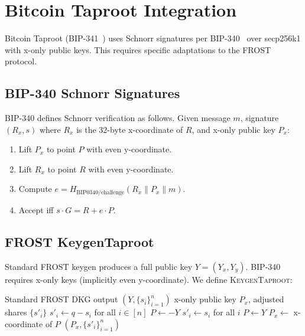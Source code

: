 \section{Bitcoin Taproot Integration}

\label{sec:taproot}

Bitcoin Taproot (BIP-341~\cite{bip341}) uses Schnorr signatures per BIP-340~\cite{bip340}
over secp256k1 with x-only public keys. This requires specific adaptations to the
FROST protocol.

\subsection{BIP-340 Schnorr Signatures}

BIP-340 defines Schnorr verification as follows. Given message $m$, signature
$(R_x, s)$ where $R_x$ is the 32-byte x-coordinate of $R$, and x-only public key
$P_x$:

\begin{enumerate}[nosep]
  \item Lift $P_x$ to point $P$ with even y-coordinate.
  \item Lift $R_x$ to point $R$ with even y-coordinate.
  \item Compute $e = H_{\text{BIP0340/challenge}}(R_x \| P_x \| m)$.
  \item Accept iff $s \cdot G = R + e \cdot P$.
\end{enumerate}

\subsection{FROST KeygenTaproot}

Standard FROST keygen produces a full public key $Y = (Y_x, Y_y)$. BIP-340 requires
x-only keys (implicitly even y-coordinate). We define \textsc{KeygenTaproot}:

\begin{algorithm}[H]
\caption{FROST KeygenTaproot}
\label{alg:frost-taproot-keygen}
\begin{algorithmic}[1]
\Require Standard FROST DKG output $(Y, \{s_i\}_{i=1}^n)$
\Ensure x-only public key $P_x$, adjusted shares $\{s'_i\}$
  \State $s'_i \gets q - s_i$ for all $i \in [n]$ 
  \State $P \gets -Y$ 
\Else
  \State $s'_i \gets s_i$ for all $i$
  \State $P \gets Y$
\EndIf
\State $P_x \gets$ x-coordinate of $P$ 
\State \Return $(P_x, \{s'_i\}_{i=1}^n)$
\end{algorithmic}
\end{algorithm}

